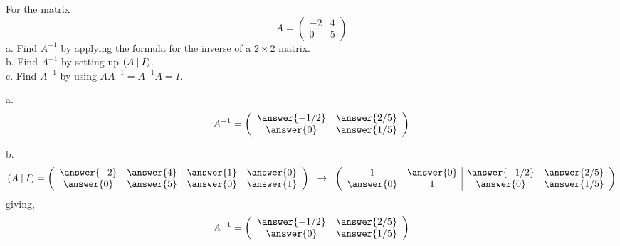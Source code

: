 \documentclass{ximera}
\author{Parisa Fatheddin}
\begin{document}
\begin{exercise}
For the matrix
\[A= \left(\begin{array}{cc}
-2 & 4 \\
0 & 5
\end{array}\right)
\]
a. Find $A^{-1}$ by applying the formula for the inverse of a $2\times 2$ matrix.\\
b. Find $A^{-1}$ by setting up $(A \hspace{.08cm}|\hspace{.08cm} I)$. \\
c. Find $A^{-1}$ by using $AA^{-1}= A^{-1}A=I$.

\begin{prompt}
a. \[
A^{-1} = \left(\begin{array}{cc} \answer{-1/2} & \answer{2/5}\\
\answer{0} & \answer{1/5}
\end{array}\right)
\]

b.
\[ (A \hspace{.08cm}|\hspace{.08cm} I ) = \left(\begin{array}{cc|cc}
\answer{-2} & \answer{4} & \answer{1} & \answer{0}\\
\answer{0} & \answer{5} & \answer{0} & \answer{1}\\
\end{array} \right)
\hspace{.2cm} \rightarrow \hspace{.2cm}
\left(\begin{array}{cc|cc}
1 & \answer{0} & \answer{-1/2} & \answer{2/5}\\
\answer{0} & 1 & \answer{0} & \answer{1/5}
\end{array} \right)
\]
giving,
\[A^{-1} = \left(\begin{array}{cc}
\answer{-1/2} & \answer{2/5}\\
\answer{0} & \answer{1/5}
\end{array} \right)\]


\end{prompt}
\end{exercise}
\end{document}
